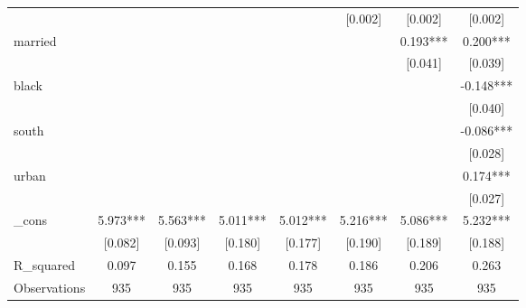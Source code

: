 \begin{table}[htbp]
\begin{tabular}{l*{7}{c}}
            &               &               &               &               &     [0.002]   &     [0.002]   &     [0.002]   \\
married     &               &               &               &               &               &       0.193***&       0.200***\\
            &               &               &               &               &               &     [0.041]   &     [0.039]   \\
black       &               &               &               &               &               &               &      -0.148***\\
            &               &               &               &               &               &               &     [0.040]   \\
south       &               &               &               &               &               &               &      -0.086***\\
            &               &               &               &               &               &               &     [0.028]   \\
urban       &               &               &               &               &               &               &       0.174***\\
            &               &               &               &               &               &               &     [0.027]   \\
\_cons      &       5.973***&       5.563***&       5.011***&       5.012***&       5.216***&       5.086***&       5.232***\\
            &     [0.082]   &     [0.093]   &     [0.180]   &     [0.177]   &     [0.190]   &     [0.189]   &     [0.188]   \\
\hline
R\_squared   &       0.097   &       0.155   &       0.168   &       0.178   &       0.186   &       0.206   &       0.263   \\
Observations&         935   &         935   &         935   &         935   &         935   &         935   &         935   \\
\hline\hline
\end{tabular}
\end{table}
